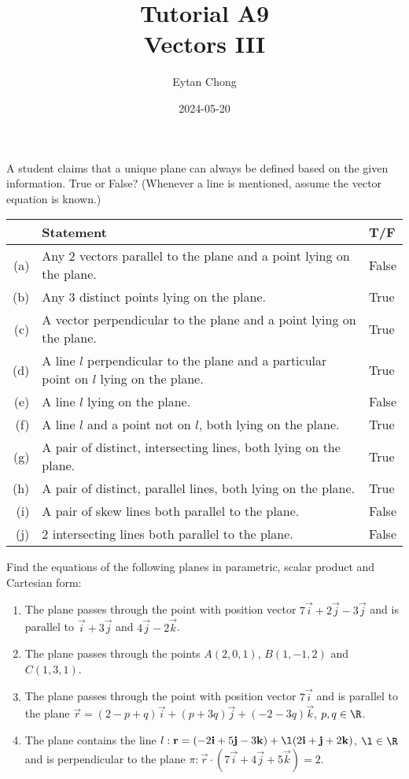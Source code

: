 \documentclass{echw}
\title{Tutorial A9\\Vectors III}
\author{Eytan Chong}
\date{2024-05-20}
\begin{document}
    \problem{}
        A student claims that a unique plane can always be defined based on the given information. True or False? (Whenever a line is mentioned, assume the vector equation is known.)

        \begin{table}[h]
            \centering
            \begin{tabularx}{\textwidth}{r X l}
            & \textbf{Statement} & \textbf{T/F}\\\hline
            (a) & Any 2 vectors parallel to the plane and a point lying on the plane. & False \\
            (b) & Any 3 distinct points lying on the plane. & True \\
            (c) & A vector perpendicular to the plane and a point lying on the plane. & True\\
            (d) & A line $l$ perpendicular to the plane and a particular point on $l$ lying on the plane. & True\\
            (e) & A line $l$ lying on the plane. & False\\
            (f) & A line $l$ and a point not on $l$, both lying on the plane. & True\\
            (g) & A pair of distinct, intersecting lines, both lying on the plane. & True\\
            (h) & A pair of distinct, parallel lines, both lying on the plane. & True\\
            (i) & A pair of skew lines both parallel to the plane. & False\\
            (j) & 2 intersecting lines both parallel to the plane. & False
            \end{tabularx}
        \end{table}

    \problem{}
        Find the equations of the following planes in parametric, scalar product and Cartesian form:

        \begin{enumerate}
            \item The plane passes through the point with position vector $7\vec i + 2 \vec j -3\vec j$ and is parallel to $\vec i + 3\vec j$ and $4\vec j - 2\vec k$.
            \item The plane passes through the points $A(2, 0, 1)$, $B(1, -1, 2)$ and $C(1, 3, 1)$.
            \item The plane passes through the point with position vector $7\vec i$ and is parallel to the plane $\vec r = (2 - p + q)\vec i + (p + 3q)\vec j + (-2-3q)\vec k$, $p, q \in \R$.
            \item The plane contains the line $l : \vec r = (-2\vec i + 5\vec j -3\vec k) + \l(2\vec i + \vec j + 2\vec k)$, $\l \in \R$ and is perpendicular to the plane $\pi : \vec r \cdot (7\vec i + 4\vec j + 5\vec k) = 2$.
        \end{enumerate}
\end{document}

